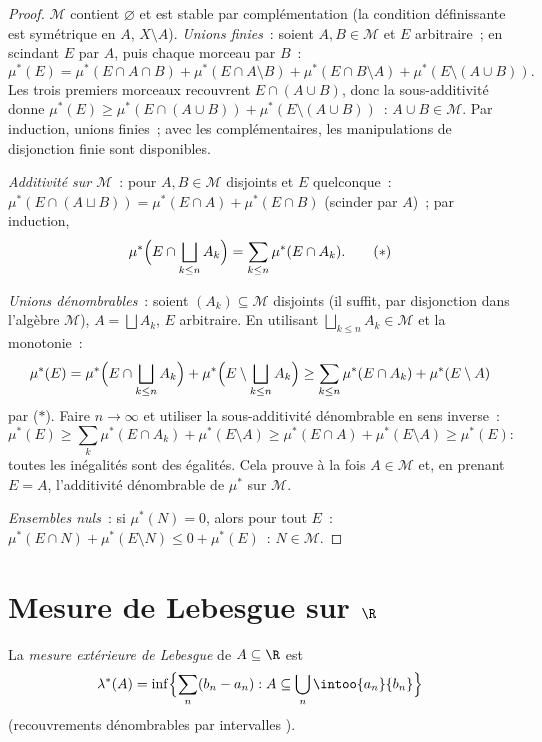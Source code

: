 \begin{proof}
$\mathcal M$ contient $\varnothing$ et est stable par
complémentation (la condition définissante est symétrique en
$A$, $X\setminus A$). \emph{Unions finies}~: soient $A, B \in
\mathcal M$ et $E$ arbitraire~; en scindant $E$ par $A$, puis
chaque morceau par $B$~:
\[
\mu^*(E) = \mu^*(E\cap A\cap B) + \mu^*(E\cap A\setminus B) +
\mu^*(E\cap B\setminus A) + \mu^*(E\setminus(A\cup B)).
\]
Les trois premiers morceaux recouvrent $E \cap (A \cup B)$,
donc la sous-additivité donne $\mu^*(E) \geq
\mu^*(E\cap(A\cup B)) + \mu^*(E\setminus(A\cup B))$~: $A \cup
B \in \mathcal M$. Par induction, unions finies~; avec les
complémentaires, les manipulations de disjonction finie sont
disponibles.

\emph{Additivité sur $\mathcal M$}~: pour $A, B \in \mathcal
M$ disjoints et $E$ quelconque~: $\mu^*(E\cap(A\sqcup B)) =
\mu^*(E\cap A) + \mu^*(E \cap B)$ (scinder par $A$)~; par
induction,
\[
\mu^*\Bigl(E \cap \bigsqcup_{k\leq n}A_k\Bigr)
= \sum_{k\leq n}\mu^*(E\cap A_k).
\tag{$*$}
\]

\emph{Unions dénombrables}~: soient $(A_k) \subseteq \mathcal
M$ disjoints (il suffit, par disjonction dans l'algèbre
$\mathcal M$), $A = \bigsqcup A_k$, $E$ arbitraire. En
utilisant $\bigsqcup_{k\leq n}A_k \in \mathcal M$ et la
monotonie~:
\[
\mu^*(E) = \mu^*\Bigl(E\cap\bigsqcup_{k\leq n}A_k\Bigr) +
\mu^*\Bigl(E\setminus\bigsqcup_{k\leq n}A_k\Bigr)
\geq \sum_{k \leq n}\mu^*(E\cap A_k) + \mu^*(E\setminus A)
\]
par ($*$). Faire $n \to \infty$ et utiliser la
sous-additivité dénombrable en sens inverse~:
\[
\mu^*(E) \geq \sum_{k}\mu^*(E\cap A_k) + \mu^*(E\setminus A)
\geq \mu^*(E \cap A) + \mu^*(E\setminus A) \geq \mu^*(E) :
\]
toutes les inégalités sont des égalités. Cela prouve à la
fois $A \in \mathcal M$ et, en prenant $E = A$,
l'additivité dénombrable de $\mu^*$ sur $\mathcal M$.

\emph{Ensembles nuls}~: si $\mu^*(N) = 0$, alors pour tout
$E$~: $\mu^*(E \cap N) + \mu^*(E\setminus N) \leq 0 +
\mu^*(E)$~: $N \in \mathcal M$.
\end{proof}

\section{Mesure de Lebesgue sur \texorpdfstring{$\R$}{R}}

\begin{definition}\label{def:b3:measure:lebesgueouter}
La \emph{mesure extérieure de Lebesgue} de $A \subseteq \R$ est
\[
\lambda^*(A) = \inf\Bigl\{\sum_{n} (b_n - a_n) :
A \subseteq \bigcup_n \intoo{a_n}{b_n}\Bigr\}
\]
(recouvrements dénombrables par intervalles ).
\end{definition}


